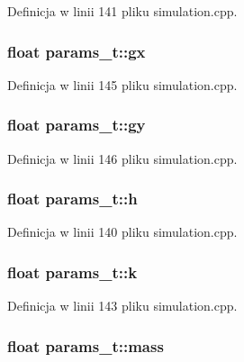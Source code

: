 Definicja w linii 141 pliku simulation.\-cpp.

\hypertarget{structparams__t_a9f3f70c0cdedcb053c9d45c2e41e67b6}{
\subsubsection[{gx}]{\setlength{\rightskip}{0pt plus 5cm}float params\-\_\-t\-::gx}}\label{structparams__t_a9f3f70c0cdedcb053c9d45c2e41e67b6}


Definicja w linii 145 pliku simulation.\-cpp.

\hypertarget{structparams__t_a0da484b4cc6a542875aa7b92e200f507}{
\subsubsection[{gy}]{\setlength{\rightskip}{0pt plus 5cm}float params\-\_\-t\-::gy}}\label{structparams__t_a0da484b4cc6a542875aa7b92e200f507}


Definicja w linii 146 pliku simulation.\-cpp.

\hypertarget{structparams__t_a27d76064f2ae0cb93a0956027cfcc19b}{
\subsubsection[{h}]{\setlength{\rightskip}{0pt plus 5cm}float params\-\_\-t\-::h}}\label{structparams__t_a27d76064f2ae0cb93a0956027cfcc19b}


Definicja w linii 140 pliku simulation.\-cpp.

\hypertarget{structparams__t_a97ee2783cf89cee1151be3250e9054b3}{
\subsubsection[{k}]{\setlength{\rightskip}{0pt plus 5cm}float params\-\_\-t\-::k}}\label{structparams__t_a97ee2783cf89cee1151be3250e9054b3}


Definicja w linii 143 pliku simulation.\-cpp.

\hypertarget{structparams__t_afe4a59fe43565a71a0a7a155714e2af1}{
\subsubsection[{mass}]{\setlength{\rightskip}{0pt plus 5cm}float params\-\_\-t\-::mass}}\label{structparams__t_afe4a59fe43565a71a0a7a155714e2af1}


